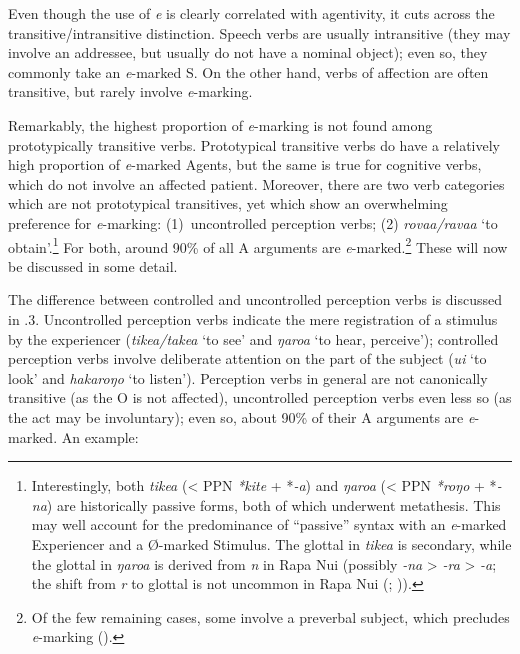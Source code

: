 Even though the use of \textit{e} is clearly correlated with agentivity, it cuts across the transitive/intransitive distinction. Speech verbs are usually intransitive (they may involve an addressee, but usually do not have a nominal object); even so, they commonly take an \textit{e}{}-marked S. On the other hand, verbs of affection are often transitive, but rarely involve \textit{e}{}-marking.

Remarkably, the highest proportion of \textit{e}{}-marking is not found among prototypically transitive verbs. Prototypical transitive verbs do have a relatively high proportion of \textit{e}{}-marked Agents, but the same is true for cognitive verbs, which do not involve an affected patient. Moreover, there are two verb categories which are not prototypical transitives, yet which show an overwhelming preference for \textit{e}{}-marking: (1)~uncontrolled perception verbs; (2) \textit{rova{\ꞌ}a}\textit{/rava{\ꞌ}a} ‘to obtain’.\footnote{\label{fn:396}Interestingly, both \textit{tike{\ꞌ}a} ({\textless} PPN \textit{*kite} + *\textit{-a}) and \textit{ŋaro{\ꞌ}a} ({\textless} PPN \textit{*roŋo} + *\textit{-na}) are historically passive forms, both of which underwent metathesis. This may well account for the predominance of “passive” syntax with an \textit{e}{}-marked Experiencer and a Ø-marked Stimulus. The glottal in \textit{tike{\ꞌ}a} is secondary, while the glottal in \textit{ŋaro{\ꞌ}a} is derived from \textit{n} in Rapa Nui (possibly \textit{-na} {\textgreater} \textit{-ra} {\textgreater} \textit{-{\ꞌ}a}; the shift from \textit{r} to glottal is not uncommon in Rapa Nui (; \citealt{Davletshin2015})).} For both, around 90\% of all A arguments are \textit{e}{}-marked.\footnote{\label{fn:397}Of the few remaining cases, some involve a preverbal subject, which precludes \textit{e}{}-marking ().} These will now be discussed in some detail.

The difference between controlled and uncontrolled perception verbs is discussed in .3. Uncontrolled perception verbs indicate the mere registration of a stimulus by the experiencer (\textit{tike{\ꞌ}a/take{\ꞌ}a} ‘to see’  
and \textit{ŋaro{\ꞌ}a} ‘to hear, perceive’);  
controlled perception verbs involve deliberate attention on the part of the subject (\textit{u{\ꞌ}i} ‘to look’ and \textit{hakaroŋo} ‘to listen’). Perception verbs in general are not canonically transitive (as the O is not affected), uncontrolled perception verbs even less so (as the act may be involuntary); even so, about 90\% of their A arguments are \textit{e}{}-marked. An example:

